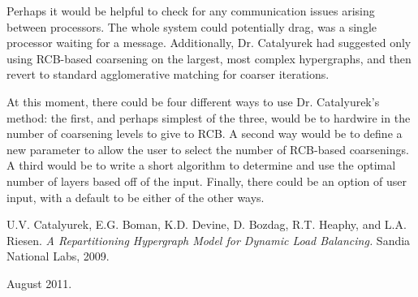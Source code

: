 \documentclass[12pt]{article}
\begin{document}
Perhaps it would be helpful to check for any communication issues arising
between processors. The whole system could potentially drag, was a
single processor waiting for a message. Additionally, Dr. Catalyurek had
suggested only using RCB-based coarsening on the largest, most complex
hypergraphs, and then revert to standard agglomerative matching for
coarser iterations.

At this moment, there could be four different ways to use Dr. Catalyurek's
method: the first, and perhaps simplest of the three, would be to hardwire
in the number of coarsening levels to give to RCB. A second way would be
to define a new parameter to allow the user to select the number of
RCB-based coarsenings. A third would be to write a short algorithm to
determine and use the optimal number of layers based off of the input.
Finally, there could be an option of user input, with a default to
be either of the other ways.

\begin{thebibliography}{5}

U.V. Catalyurek, E.G. Boman, K.D. Devine, D. Bozdag,
  R.T. Heaphy, and L.A. Riesen. \emph{A Repartitioning Hypergraph Model
    for Dynamic Load Balancing.} Sandia National Labs, 2009.

\end{thebibliography}

{\small \noindent August 2011.}
\end{document}
